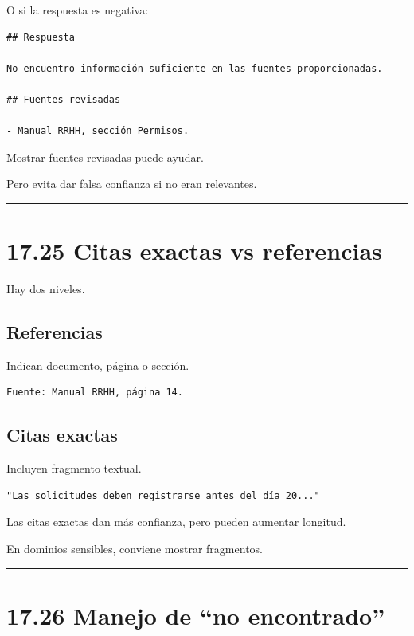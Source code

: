 O si la respuesta es negativa:

\begin{lstlisting}
## Respuesta

No encuentro información suficiente en las fuentes proporcionadas.

## Fuentes revisadas

- Manual RRHH, sección Permisos.
\end{lstlisting}

Mostrar fuentes revisadas puede ayudar.

Pero evita dar falsa confianza si no eran relevantes.

\begin{center}\rule{0.5\linewidth}{0.5pt}\end{center}

\section{17.25 Citas exactas vs
referencias}\label{citas-exactas-vs-referencias}

Hay dos niveles.

\subsection{Referencias}\label{referencias}

Indican documento, página o sección.

\begin{lstlisting}
Fuente: Manual RRHH, página 14.
\end{lstlisting}

\subsection{Citas exactas}\label{citas-exactas}

Incluyen fragmento textual.

\begin{lstlisting}
"Las solicitudes deben registrarse antes del día 20..."
\end{lstlisting}

Las citas exactas dan más confianza, pero pueden aumentar longitud.

En dominios sensibles, conviene mostrar fragmentos.

\begin{center}\rule{0.5\linewidth}{0.5pt}\end{center}

\section{17.26 Manejo de ``no
encontrado''}\label{manejo-de-no-encontrado}

